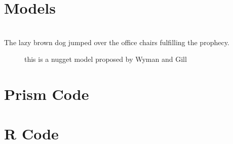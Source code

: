 \documentclass[12pt, titlepage]{article}
\begin{document}
\section{Models}
\blindtext[5]
\\ The lazy brown dog jumped over the office chairs fulfilling the prophecy.\supercite{notides_positive_1981, brandt_cooperativity_1997}

\begin{figure}%
\centering

\caption{this is a nugget model proposed by Wyman and Gill \supercite{wyman_binding_1990}}
\end{figure}

\blindtext[5]

\clearpage
\begin{appendices}
\section{Prism Code}
\blindtext[5]
\section{R Code}
\blindtext[5]
\end{appendices}

\clearpage
\printbibliography
\end{document}

